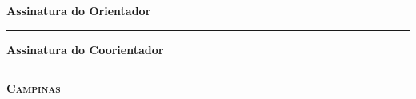 \noindent
{\small \bfseries
\noindent
Assinatura do Orientador

\vspace{.7cm}
\noindent
\rule[1pt]{7cm}{.5pt}  %
}
\vspace{.5cm}


{\small \bfseries
\noindent
Assinatura do Coorientador

\vspace{.7cm}
\noindent
\rule[1pt]{7cm}{.5pt}  %
}
\vfill
\begin{center}
    {\small \scshape \bfseries Campinas \\ \ano}
\end{center}
